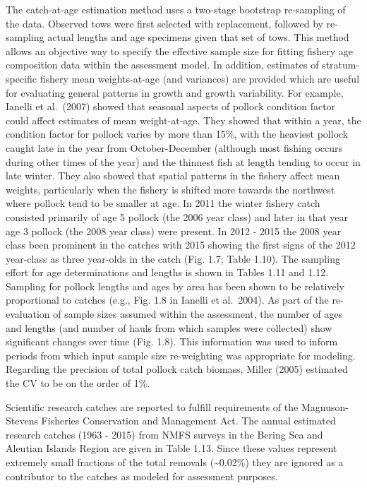 The catch-at-age estimation method uses a two-stage bootstrap
re-sampling of the data. Observed tows were first selected with
replacement, followed by re-sampling actual lengths and age specimens
given that set of tows. This method allows an objective way to specify
the effective sample size for fitting fishery age composition data
within the assessment model. In addition, estimates of stratum-specific
fishery mean weights-at-age (and variances) are provided which are
useful for evaluating general patterns in growth and growth variability.
For example, Ianelli et al.~(2007) showed that seasonal aspects of
pollock condition factor could affect estimates of mean weight-at-age.
They showed that within a year, the condition factor for pollock varies
by more than 15\%, with the heaviest pollock caught late in the year
from October-December (although most fishing occurs during other times
of the year) and the thinnest fish at length tending to occur in late
winter. They also showed that spatial patterns in the fishery affect
mean weights, particularly when the fishery is shifted more towards the
northwest where pollock tend to be smaller at age. In 2011 the winter
fishery catch consisted primarily of age 5 pollock (the 2006 year class)
and later in that year age 3 pollock (the 2008 year class) were present.
In 2012 - 2015 the 2008 year class been prominent in the catches with
2015 showing the first signs of the 2012 year-class as three year-olds
in the catch (Fig. 1.7; Table 1.10). The sampling effort for age
determinations and lengths is shown in Tables 1.11 and 1.12. Sampling
for pollock lengths and ages by area has been shown to be relatively
proportional to catches (e.g., Fig. 1.8 in Ianelli et al.~2004). As part
of the re-evaluation of sample sizes assumed within the assessment, the
number of ages and lengths (and number of hauls from which samples were
collected) show significant changes over time (Fig. 1.8). This
information was used to inform periods from which input sample size
re-weighting was appropriate for modeling. Regarding the precision of
total pollock catch biomass, Miller (2005) estimated the CV to be on the
order of 1\%.

Scientific research catches are reported to fulfill requirements of the
Magnuson-Stevens Fisheries Conservation and Management Act. The annual
estimated research catches (1963 - 2015) from NMFS surveys in the Bering
Sea and Aleutian Islands Region are given in Table 1.13. Since these
values represent extremely small fractions of the total removals
(\textasciitilde{}0.02\%) they are ignored as a contributor to the
catches as modeled for assessment purposes.

